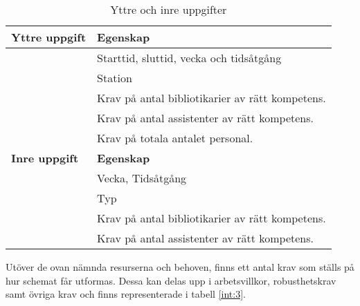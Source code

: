\begin{table}[!h]
\caption{Yttre och inre uppgifter}
\label{int:2}
\begin{tabular}{|l|l|}
\hline
\textbf{Yttre uppgift} & \textbf{Egenskap} \\ \hline
 & Starttid, sluttid, vecka och tidsåtgång \
\\ \hline 
 & Station
\\ \hline 
 & Krav på antal bibliotikarier av rätt kompetens.
\\ \hline 
 & Krav på antal assistenter av rätt kompetens.
\\ \hline 
 & Krav på totala antalet personal.
\\ \hline 

\textbf{Inre uppgift} & \textbf{Egenskap} \\ \hline
 & Vecka, Tidsåtgång \
\\ \hline 
 & Typ
\\ \hline 
 & Krav på antal bibliotikarier av rätt kompetens.
\\ \hline 
 & Krav på antal assistenter av rätt kompetens.
\\ \hline 
\end{tabular}
\end{table}

Utöver de ovan nämnda resurserna och behoven, finns ett antal krav som ställs på hur schemat får utformas. Dessa kan delas upp i arbetsvillkor, robusthetskrav samt övriga krav och finns representerade i tabell \ref{int:3}.

